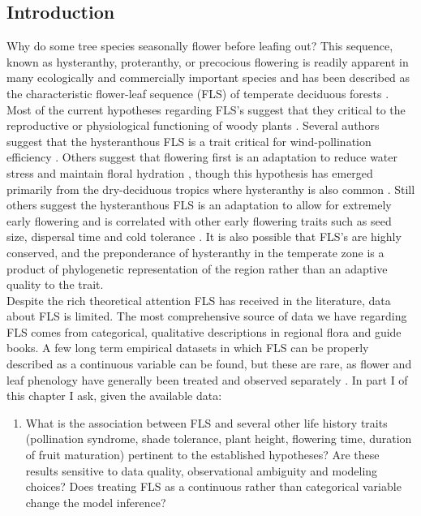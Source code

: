 \documentclass{article}\usepackage[]{graphicx}\usepackage[]{color}
\begin{document}
\subsection*{Introduction}
\indent\indent Why do some tree species seasonally flower before leafing out? This sequence, known as hysteranthy, proteranthy, or precocious flowering is readily apparent in many ecologically and commercially important species and has been described as  the characteristic flower-leaf sequence (FLS) of temperate deciduous forests \citep{Rathcke1985}. Most of the current hypotheses regarding FLS's suggest that they critical to the reproductive or physiological functioning of woody plants \citep{Gougherty2018}. Several authors suggest that the hysteranthous FLS is a trait critical for wind-pollination efficiency \citep{Whitehead1969,Friedman2009}. Others suggest that flowering first is an adaptation to reduce water stress and maintain floral hydration \citep{Franklin2016}, though this hypothesis has emerged primarily from the dry-deciduous tropics where hysteranthy is also common \citep{Janzen1967,Franklin2016}.  Still others suggest the hysteranthous FLS is an adaptation to allow for extremely early flowering and is correlated with other early flowering traits such as seed size, dispersal time and cold tolerance \citep{Gougherty2018,Bolmgren2003,Primack1987}. It is also possible that FLS's are highly conserved, and the preponderance of hysteranthy in the temperate zone is a product of phylogenetic representation of the region rather than an adaptive quality to the trait.\\
\indent Despite the rich theoretical attention FLS has received in the literature, data about FLS is limited. The most comprehensive source of data we have regarding FLS comes from categorical, qualitative descriptions in regional flora and guide books. A few long term empirical datasets in which FLS can be properly described as a continuous variable can be found, but these are rare, as flower and leaf phenology have generally been treated and observed separately \citep{Wolkovich2014}. In part I of this chapter I ask, given the available data:
\begin{enumerate}
\item  What is the association between FLS and several other life history traits (pollination syndrome, shade tolerance, plant height, flowering time, duration of fruit maturation) pertinent to the established hypotheses? Are these results sensitive to data quality, observational ambiguity and modeling choices? Does treating FLS as a continuous rather than categorical variable change the model inference?
\end{enumerate}
\end{document}

